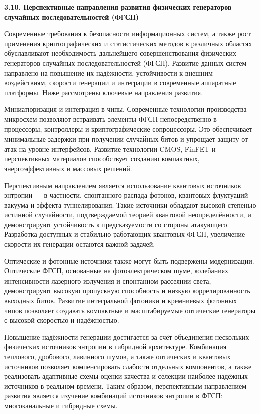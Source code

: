 \textbf{3.10. Перспективные направления развития физических генераторов
случайных последовательностей (ФГСП)}

Современные требования к безопасности информационных систем, а также
рост применения криптографических и статистических методов в различных
областях обуславливают необходимость дальнейшего совершенствования
физических генераторов случайных последовательностей (ФГСП). Развитие
данных систем направлено на повышение их надёжности, устойчивости к
внешним воздействиям, скорости генерации и интеграции в современные
аппаратные платформы. Ниже рассмотрены ключевые направления развития.

Миниатюризация и интеграция в чипы. Современные технологии производства
микросхем позволяют встраивать элементы ФГСП непосредственно в
процессоры, контроллеры и криптографические сопроцессоры. Это
обеспечивает минимальные задержки при получении случайных битов и
упрощает защиту от атак на уровне интерфейсов. Развитие технологии CMOS,
FinFET и перспективных материалов способствует созданию компактных,
энергоэффективных и массовых решений.

Перспективным направлением является использование квантовых источников
энтропии --- в частности, спонтанного распада фотонов, квантовых
флуктуаций вакуума и эффекта туннелирования. Такие источники обладают
высокой степенью истинной случайности, подтверждаемой теорией квантовой
неопределённости, и демонстрируют устойчивость к предсказуемости со
стороны атакующего. Разработка доступных и стабильно работающих
квантовых ФГСП, увеличение скорости их генерации остаются важной
задачей.

Оптические и фотонные источники также могут быть подвержены
модернизации. Оптические ФГСП, основанные на фотоэлектрическом шуме,
колебаниях интенсивности лазерного излучения и спонтанном рассеянии
света, демонстрируют высокую пропускную способность и низкую
коррелированность выходных битов. Развитие интегральной фотоники и
кремниевых фотонных чипов позволяет создавать компактные и
масштабируемые оптические генераторы с высокой скоростью и надёжностью.

Повышение надёжности генерации достигается за счёт объединения
нескольких физических источников энтропии в гибридной архитектуре.
Комбинация теплового, дробового, лавинного шумов, а также оптических и
квантовых источников позволяет компенсировать слабости отдельных
компонентов, а также реализовать адаптивные схемы оценки качества и
селекции наиболее надёжных источников в реальном времени. Таким образом,
перспективным направлением развития является изучение комбинаций
источников энтропии в ФГСП: многоканальные и гибридные схемы.

